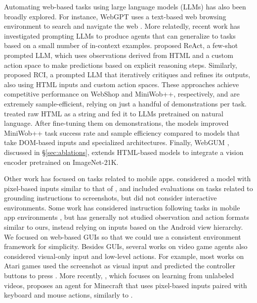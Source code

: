 Automating web-based tasks using large language models (LLMs) has also been broadly explored. For instance, WebGPT uses a text-based web browsing environment to search and navigate the web \citep{nakano2021webgpt}.
More relatedly, recent work has investigated prompting LLMs to produce agents that can generalize to tasks based on a small number of in-context examples.
\citet{yao2023react} proposed ReAct, a few-shot prompted LLM, which uses observations derived from HTML and a custom action space to make predictions based on explicit reasoning steps.
Similarly, \citet{kim2023language} proposed RCI, a prompted LLM that iteratively critiques and refines its outputs, also using HTML inputs and custom action spaces.
These approaches achieve competitive performance on WebShop and MiniWob++, respectively, and are extremely sample-efficient, relying on just a handful of demonstrations per task. 
\citet{gur2022understanding} treated raw HTML as a string and fed it to LLMs pretrained on natural language. After fine-tuning them on demonstrations, 
the models improved MiniWob++ task success rate and sample efficiency compared to models that take DOM-based inputs and specialized architectures.
Finally, WebGUM \citep{webgum23}, discussed in \S\ref{sec:ablations}, extends HTML-based models to integrate a vision encoder pretrained on ImageNet-21K.

Other work has focused on tasks related to mobile apps. \citet{li2022spotlight} considered a model with pixel-based inputs similar to that of \citet{lee2022pix2struct}, and included evaluations on tasks related to grounding instructions to screenshots, but did not consider interactive environments. Some work has considered instruction following tasks in mobile app environments \citep{li2020mapping,burns2022interactive}, but has generally not studied observation and action formats similar to ours, instead relying on inputs based on the Android view hierarchy.
We focused on web-based GUIs so that we could use a consistent environment framework for simplicity.
Besides GUIs, several works on video game agents also considered visual-only input and low-level actions.
For example, most works on Atari games used the screenshot as visual input and predicted the controller buttons to press \citep{Mnih2015HumanlevelCT}.
More recently, \citet{baker2022video}, which focuses on learning from unlabeled videos, proposes an agent for Minecraft that uses pixel-based inputs paired with keyboard and mouse actions, similarly to \ours. 
